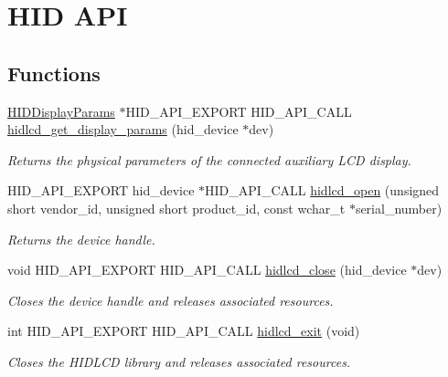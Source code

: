 \hypertarget{group__API}{}\section{H\+ID A\+PI}
\label{group__API}
\subsection*{Functions}
\begin{DoxyCompactItemize}
\item 
\hyperlink{structHIDDisplayParams}{H\+I\+D\+Display\+Params} $\ast$H\+I\+D\+\_\+\+A\+P\+I\+\_\+\+E\+X\+P\+O\+RT H\+I\+D\+\_\+\+A\+P\+I\+\_\+\+C\+A\+LL \hyperlink{group__API_gabb41034a653433cec87bd56d20e7da32}{hidlcd\+\_\+get\+\_\+display\+\_\+params} (hid\+\_\+device $\ast$dev)
\begin{DoxyCompactList}\small\item\em Returns the physical parameters of the connected auxiliary L\+CD display. \end{DoxyCompactList}\item 
H\+I\+D\+\_\+\+A\+P\+I\+\_\+\+E\+X\+P\+O\+RT hid\+\_\+device $\ast$H\+I\+D\+\_\+\+A\+P\+I\+\_\+\+C\+A\+LL \hyperlink{group__API_ga9fbc6a6acff713baca89139cc99fed1e}{hidlcd\+\_\+open} (unsigned short vendor\+\_\+id, unsigned short product\+\_\+id, const wchar\+\_\+t $\ast$serial\+\_\+number)
\begin{DoxyCompactList}\small\item\em Returns the device handle. \end{DoxyCompactList}\item 
void H\+I\+D\+\_\+\+A\+P\+I\+\_\+\+E\+X\+P\+O\+RT H\+I\+D\+\_\+\+A\+P\+I\+\_\+\+C\+A\+LL \hyperlink{group__API_gab5076b4a075677b9298c2261621668bf}{hidlcd\+\_\+close} (hid\+\_\+device $\ast$dev)
\begin{DoxyCompactList}\small\item\em Closes the device handle and releases associated resources. \end{DoxyCompactList}\item 
int H\+I\+D\+\_\+\+A\+P\+I\+\_\+\+E\+X\+P\+O\+RT H\+I\+D\+\_\+\+A\+P\+I\+\_\+\+C\+A\+LL \hyperlink{group__API_ga67748e0754a894b7d04d9f0beef058fc}{hidlcd\+\_\+exit} (void)
\begin{DoxyCompactList}\small\item\em Closes the H\+I\+D\+L\+CD library and releases associated resources. \end{DoxyCompactList}\item 

\end{DoxyCompactItemize}
